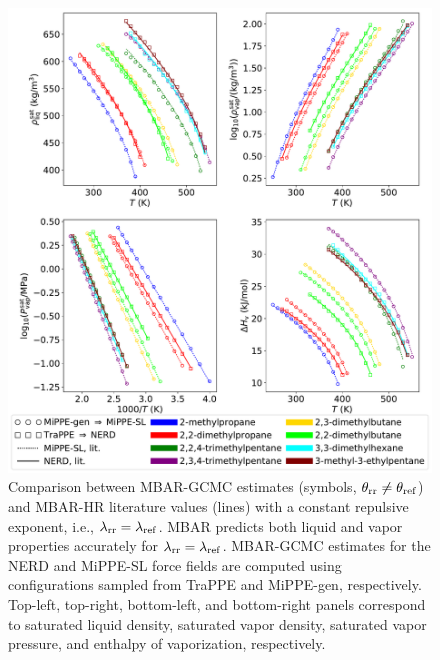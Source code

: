\documentclass[journal=jced,manuscript=article]{achemso}
\begin{document}
	\begin{figure}[H]
		\centering
		\includegraphics[width=6.4in]{refFF_to_rrFF_lam_constant.pdf}
		\caption{Comparison between MBAR-GCMC estimates (symbols, $\theta_{\rm rr} \neq \theta_{\rm ref}$) and MBAR-HR literature values\cite{Potoff_branched} (lines) with a constant repulsive exponent, i.e., $\lambda_{\rm rr} = \lambda_{\rm ref}$. MBAR predicts both liquid and vapor properties accurately for $\lambda_{\rm rr} = \lambda_{\rm ref}$. MBAR-GCMC estimates for the NERD and MiPPE-SL force fields are computed using configurations sampled from TraPPE and MiPPE-gen, respectively. Top-left, top-right, bottom-left, and bottom-right panels correspond to saturated liquid density, saturated vapor density, saturated vapor pressure, and enthalpy of vaporization, respectively.}
		\label{fig:refFF_to_rrFF_lam_constant}
	\end{figure}
\end{document}
